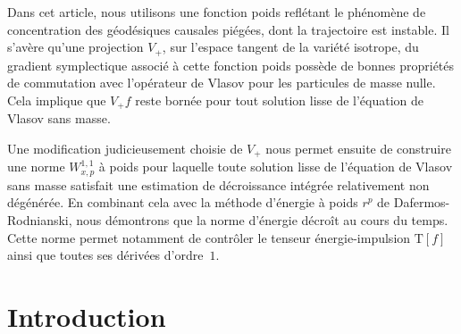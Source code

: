 \documentclass[JEP,XML,SOM,Unicode,published]{cedram}
\theoremstyle{plain}
\theoremstyle{definition}
\begin{document}


\begin{altabstract}
Dans cet article, nous utilisons une fonction poids reflétant le phénomène de concentration des géodésiques causales piégées, dont la trajectoire est instable. Il s'avère qu'une projection $V_+$, sur l'espace tangent de la variété isotrope, du gradient symplectique associé à cette fonction poids possède de bonnes propriétés de commutation avec l'opérateur de Vlasov pour les particules de masse nulle. Cela implique que $V_+f$ reste bornée pour tout solution lisse de l'équation de Vlasov sans masse.

Une modification judicieusement choisie de $V_+$ nous permet ensuite de construire une norme $W^{1,1}_{x,p}$ à poids pour laquelle toute solution lisse de l'équation de Vlasov sans masse satisfait une estimation de décroissance intégrée relativement non dégénérée. En combinant cela avec la méthode d'énergie à poids $r^p$ de Dafermos-Rodnianski, nous démontrons que la norme d'énergie décroît au cours du temps. Cette norme permet notamment de contrôler le tenseur énergie-impulsion $\mathrm{T}[f]$ ainsi que toutes ses dérivées d'ordre~$1$.
\end{altabstract}

\maketitle
\vspace*{-\baselineskip}
\tableofcontents


\section{Introduction}
\end{document}
